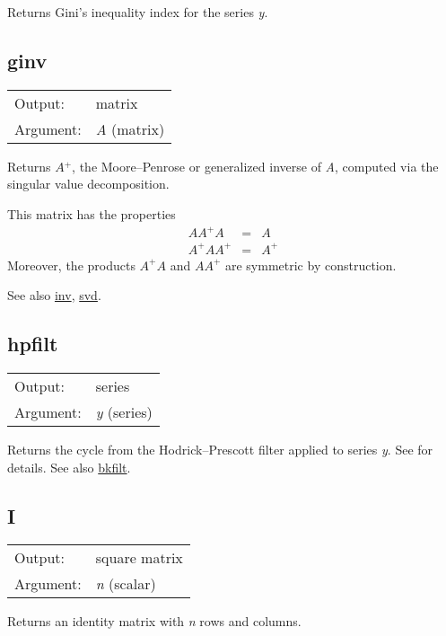 	  Returns Gini's inequality index for the series
	  \textsl{y}.

\subsection{ginv}
\hypertarget{func-ginv}{}

\begin{tabular}{ll}
Output:     & matrix\\
Argument:   & \textsl{A} (matrix)\\
\end{tabular}

	  Returns \ensuremath{A}\ensuremath{^{+}}, the Moore--Penrose 
	  or generalized inverse of \textsl{A}, computed
	  via the singular value decomposition.

	  This matrix has the properties
	  \begin{eqnarray*}
	  A A^+ A & = & A \\
	  A^+ A A^+ & = & A^+ 
	  \end{eqnarray*}
	  Moreover, the products $A^+ A$ and $A A^+$ are
	  symmetric by construction.

	  See also \hyperlink{func-inv}{inv}, \hyperlink{func-svd}{svd}.

\subsection{hpfilt}
\hypertarget{func-hpfilt}{}

\begin{tabular}{ll}
Output:     & series\\
Argument:   & \textsl{y} (series)\\
\end{tabular}

	  Returns the cycle from the Hodrick--Prescott filter applied
	  to series \textsl{y}.  See \GUG{} for details. 
	  See also \hyperlink{func-bkfilt}{bkfilt}.

\subsection{I}
\hypertarget{func-I}{}

\begin{tabular}{ll}
Output:     & square matrix\\
Argument:   & \textsl{n} (scalar)\\
\end{tabular}

	  Returns an identity matrix with \textsl{n} rows and
	  columns.


